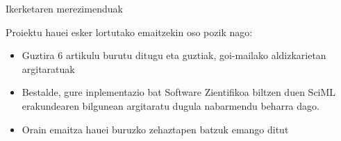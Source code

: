 \documentclass[
 10pt,%
 compress,%
 t,       %
 xcolor=svgnames
]{beamer}
\theoremstyle{definition} \newtheorem{definicion}{Definicion}[section]
\theoremstyle{propiedades} \newtheorem{propiedades}{Propiedades}[section]
\begin{document}
\begin{frame}{Ikerketaren merezimenduak}
{Proiektu hauei esker lortutako emaitzekin oso pozik nago:

\medskip

\begin{itemize}
\item Guztira 6 artikulu burutu ditugu eta guztiak, goi-mailako aldizkarietan argitaratuak

\medskip
\item Bestalde,  gure  inplementazio bat Software Zientifikoa biltzen duen SciML erakundearen bilgunean argitaratu  dugula nabarmendu beharra dago.

\medskip
\item Orain emaitza hauei buruzko zehaztapen batzuk emango ditut

\end{itemize}



}

\end{frame}

\end{document}
